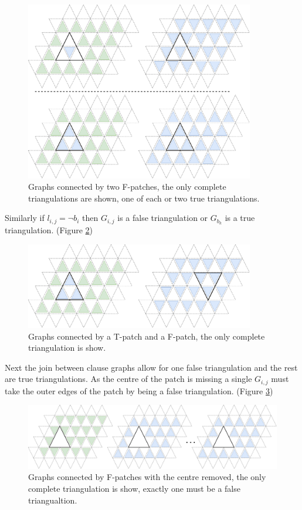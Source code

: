 \documentclass[a4paper,11pt]{report}
\begin{document}
\begin{figure}[h!]
\begin{center}
		\includegraphics[width=100mm]{figures/first_holyer_lemma.png}
\end{center}
		\caption{Graphs connected by two F-patches, the only complete triangulations are shown, one of each or two true triangulations.}
\label{holyerone}
\end{figure}


Similarly if  $l_{i,j}=\neg b_i$ then $G_{i,j}$ is a false triangulation or $G_{b_k}$ is a true triangulation. (Figure \ref{holyertwo})

\begin{figure}[h!]
\begin{center}
		\includegraphics[width=100mm]{figures/lemma_two_holyer.png}
\end{center}
		\caption{Graphs connected by a T-patch and a F-patch, the only complete triangulation is show.}
\label{holyertwo}
\end{figure}

Next the join between clause graphs allow for one false triangulation and the rest  are true triangulations. As the centre of the patch is missing a single $G_{i,j}$ must take the outer edges of the patch by being a false triangulation. (Figure \ref{holyerthree})

\begin{figure}[h!]
\begin{center}
		\includegraphics[width=120mm]{figures/lemma_three_holyer.png}
\end{center}
		\caption{Graphs connected by F-patches with the centre removed, the only complete triangulation is show, exactly one must be a false triangualtion.}
\label{holyerthree}
\end{figure}
\end{document}
